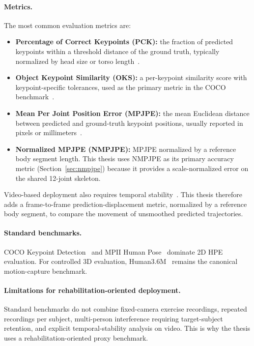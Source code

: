 \paragraph{Metrics.} The most common evaluation metrics are:
\begin{itemize}
  \item \textbf{Percentage of Correct Keypoints (PCK):} the fraction of predicted keypoints within a threshold distance of the ground truth, typically normalized by head size or torso length~\cite{andriluka2014mpii}.
  \item \textbf{Object Keypoint Similarity (OKS):} a per-keypoint similarity score with keypoint-specific tolerances, used as the primary metric in the COCO benchmark~\cite{lin2014coco}.
  \item \textbf{Mean Per Joint Position Error (MPJPE):} the mean Euclidean distance between predicted and ground-truth keypoint positions, usually reported in pixels or millimeters~\cite{ionescu2014human36m}.
  \item \textbf{Normalized MPJPE (NMPJPE):} MPJPE normalized by a reference body segment length. This thesis uses NMPJPE as its primary accuracy metric (Section~\ref{sec:nmpjpe}) because it provides a scale-normalized error on the shared 12-joint skeleton.
\end{itemize}

Video-based deployment also requires temporal stability~\cite{zeng2022smoothnet}. This thesis therefore adds a frame-to-frame prediction-displacement metric, normalized by a reference body segment, to compare the movement of unsmoothed predicted trajectories.

\paragraph{Standard benchmarks.} COCO Keypoint Detection~\cite{lin2014coco} and MPII Human Pose~\cite{andriluka2014mpii} dominate 2D HPE evaluation. For controlled 3D evaluation, Human3.6M~\cite{ionescu2014human36m} remains the canonical motion-capture benchmark.

\paragraph{Limitations for rehabilitation-oriented deployment.} Standard benchmarks do not combine fixed-camera exercise recordings, repeated recordings per subject, multi-person interference requiring target-subject retention, and explicit temporal-stability analysis on video. This is why the thesis uses a rehabilitation-oriented proxy benchmark.


